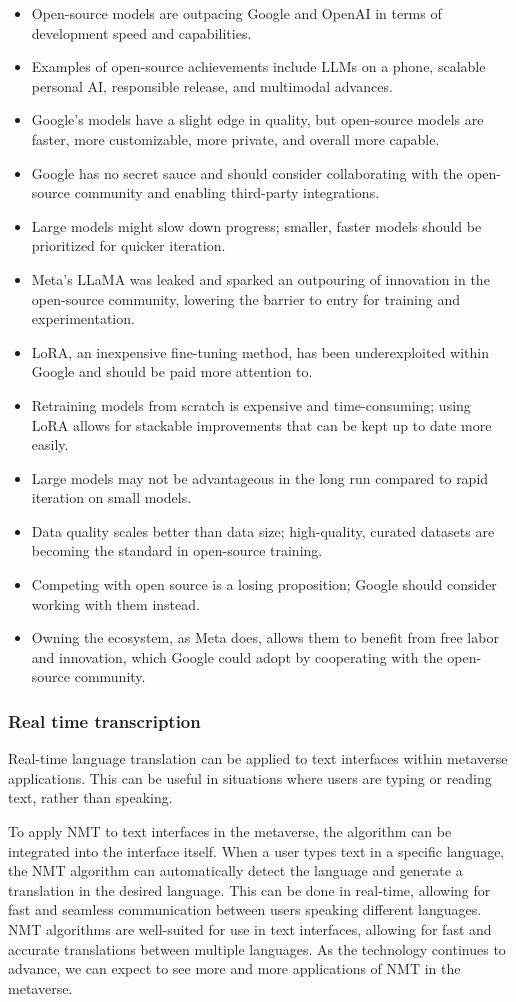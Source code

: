 \begin{itemize}
\item Open-source models are outpacing Google and OpenAI in terms of development speed and capabilities.
\item Examples of open-source achievements include LLMs on a phone, scalable personal AI, responsible release, and multimodal advances.
\item Google's models have a slight edge in quality, but open-source models are faster, more customizable, more private, and overall more capable.
\item Google has no secret sauce and should consider collaborating with the open-source community and enabling third-party integrations.
\item Large models might slow down progress; smaller, faster models should be prioritized for quicker iteration.
\item Meta's LLaMA was leaked and sparked an outpouring of innovation in the open-source community, lowering the barrier to entry for training and experimentation.
\item LoRA, an inexpensive fine-tuning method, has been underexploited within Google and should be paid more attention to.
\item Retraining models from scratch is expensive and time-consuming; using LoRA allows for stackable improvements that can be kept up to date more easily.
\item Large models may not be advantageous in the long run compared to rapid iteration on small models.
\item Data quality scales better than data size; high-quality, curated datasets are becoming the standard in open-source training.
\item Competing with open source is a losing proposition; Google should consider working with them instead.
\item Owning the ecosystem, as Meta does, allows them to benefit from free labor and innovation, which Google could adopt by cooperating with the open-source community.
\end{itemize}
\subsubsection{Real time transcription}
Real-time language translation can be applied to text interfaces within metaverse applications. This can be useful in situations where users are typing or reading text, rather than speaking.\par
To apply NMT to text interfaces in the metaverse, the algorithm can be integrated into the interface itself. When a user types text in a specific language, the NMT algorithm can automatically detect the language and generate a translation in the desired language. This can be done in real-time, allowing for fast and seamless communication between users speaking different languages. NMT algorithms are well-suited for use in text interfaces, allowing for fast and accurate translations between multiple languages. As the technology continues to advance, we can expect to see more and more applications of NMT in the metaverse.
